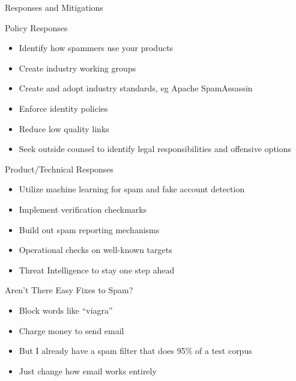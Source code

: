 \documentclass[nobackground,dvipsnames,table]{beamer}
\begin{document}
\begin{frame}{}
    Responses and Mitigations
\end{frame}

\begin{frame}{Policy Responses}
    \begin{itemize}
        \item Identify how spammers use your products
        \item Create industry working groups
        \item Create and adopt industry standards, eg Apache SpamAssassin
        \item Enforce identity policies
        \item Reduce low quality links
        \item Seek outside counsel to identify legal responsibilities and offensive options
    \end{itemize}
\end{frame}

\begin{frame}{Product/Technical Responses}
    \begin{itemize}
        \item Utilize machine learning for spam and fake account detection
        \item Implement verification checkmarks
        \item Build out spam reporting mechanisms
        \item Operational checks on well-known targets
        \item Threat Intelligence to stay one step ahead
    \end{itemize}
\end{frame}

\begin{frame}{Aren’t There Easy Fixes to Spam?}
    \begin{itemize}
        \item Block words like “viagra”
        \item Charge money to send email
        \item But I already have a spam filter that does 95\% of a test corpus
        \item Just change how email works entirely
    \end{itemize}
\end{frame}
\end{document}
